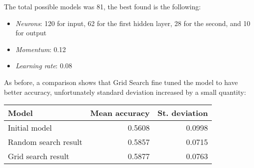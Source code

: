The total possible models was 81, the best found is the following:
\begin{itemize}
    \item \emph{Neurons}: 120 for input, 62 for the first hidden layer, 28 for the second, and 10 for output 
    \item \emph{Momentum}: 0.12
    \item \emph{Learning rate}: 0.08
\end{itemize}
As before, a comparison shows that Grid Search fine tuned the model 
to have better accuracy, unfortunately standard deviation increased by a small 
quantity:
\begin{center}
    \begin{tabular}{ |l|r|r| } 
        \hline
        Model & Mean accuracy & St. deviation \\
        \hline
        Initial model & 0.5608& 0.0998\\
        Random search result & 0.5857 & 0.0715 \\
        Grid search result & 0.5877 & 0.0763 \\
        \hline
    \end{tabular}
\end{center}
\newpage